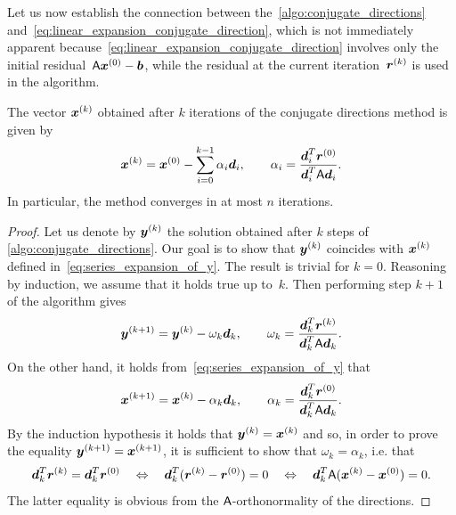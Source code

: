 Let us now establish the connection between the~\cref{algo:conjugate_directions} and~\eqref{eq:linear_expansion_conjugate_direction},
which is not immediately apparent because~\eqref{eq:linear_expansion_conjugate_direction} involves only the initial residual~$\mathsf A \mathbf{\boldsymbol{x}}^{(0)} - \mathbf{\boldsymbol{b}}$,
while the residual at the current iteration~$\mathbf{\boldsymbol{r}}^{(k)}$ is used in the algorithm.
\begin{proposition}
    \label{proposition:conjugate_directions}
    The vector $\mathbf{\boldsymbol{x}}^{(k)}$ obtained after $k$ iterations of the conjugate directions method is given by
    \begin{equation}
        \label{eq:series_expansion_of_y}
        \mathbf{\boldsymbol{x}}^{(k)} = \mathbf{\boldsymbol{x}}^{(0)}
        - \sum_{i=0}^{k-1} \alpha_i \mathbf{\boldsymbol{d}}_i,
        \qquad \alpha_i = \frac{\mathbf{\boldsymbol{d}}_i^T \mathbf{\boldsymbol{r}}^{(0)}}{\mathbf{\boldsymbol{d}}_i^T \mathsf A \mathbf{\boldsymbol{d}}_i}.
    \end{equation}
    In particular,
    the method converges in at most $n$ iterations.
\end{proposition}
\begin{proof}
    Let us denote by $\mathbf{\boldsymbol{y}}^{(k)}$ the solution obtained after $k$ steps of \cref{algo:conjugate_directions}.
    Our goal is to show that $\mathbf{\boldsymbol{y}}^{(k)}$ coincides with $\mathbf{\boldsymbol{x}}^{(k)}$ defined in~\eqref{eq:series_expansion_of_y}.
    The result is trivial for $k = 0$.
    Reasoning by induction,
    we assume that it holds true up to~$k$.
    Then performing step $k+1$ of the algorithm gives
    \[
        \mathbf{\boldsymbol{y}}^{(k+1)} = \mathbf{\boldsymbol{y}}^{(k)} - \omega_k \mathbf{\boldsymbol{d}}_k, \qquad \omega_k = \frac{\mathbf{\boldsymbol{d}}_k^T \mathbf{\boldsymbol{r}}^{(k)}}{\mathbf{\boldsymbol{d}}_k^T \mathsf A \mathbf{\boldsymbol{d}}_k}.
    \]
    On the other hand,
    it holds from~\eqref{eq:series_expansion_of_y} that
    \[
        \mathbf{\boldsymbol{x}}^{(k+1)} = \mathbf{\boldsymbol{x}}^{(k)} - \alpha_k \mathbf{\boldsymbol{d}}_k, \qquad \alpha_k = \frac{\mathbf{\boldsymbol{d}}_k^T \mathbf{\boldsymbol{r}}^{(0)}}{\mathbf{\boldsymbol{d}}_k^T \mathsf A \mathbf{\boldsymbol{d}}_k}.
    \]
    By the induction hypothesis it holds that $\mathbf{\boldsymbol{y}}^{(k)} = \mathbf{\boldsymbol{x}}^{(k)}$ and so,
    in order to prove the equality $\mathbf{\boldsymbol{y}}^{(k+1)} = \mathbf{\boldsymbol{x}}^{(k+1)}$,
    it is sufficient to show that $\omega_k = \alpha_k$, i.e. that
    \[
        \mathbf{\boldsymbol{d}}_k^T \mathbf{\boldsymbol{r}}^{(k)} = \mathbf{\boldsymbol{d}}_k^T \mathbf{\boldsymbol{r}}^{(0)}
        \quad \Leftrightarrow \quad
        \mathbf{\boldsymbol{d}}_k^T (\mathbf{\boldsymbol{r}}^{(k)} - \mathbf{\boldsymbol{r}}^{(0)}) = 0
        \quad \Leftrightarrow \quad
        \mathbf{\boldsymbol{d}}_k^T \mathsf A (\mathbf{\boldsymbol{x}}^{(k)} - \mathbf{\boldsymbol{x}}^{(0)}) = 0.
    \]
    The latter equality is obvious from the $\mathsf A$-orthonormality of the directions.
\end{proof}

